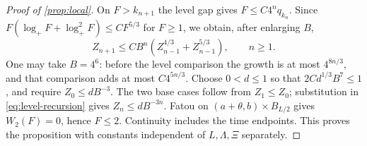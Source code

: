 \begin{proof}[Proof of \cref{prop:local}]
On $F>k_{n+1}$ the level gap gives $F\le C4^nq_{k_n}$. Since $F(\log_+F+\log_+^2F)\le CF^{5/3}$ for $F\ge1$, we obtain, after enlarging $B$,
\begin{equation}\label{eq:level-recursion}
 Z_{n+1}\le CB^n(Z_{n-1}^{4/3}+Z_{n-1}^{5/3}),\qquad n\ge1.
\end{equation}
One may take $B=4^6$: before the level comparison the growth is at most $4^{8n/3}$, and that comparison adds at most $C4^{5n/3}$. Choose $0<d\le1$ so that $2Cd^{1/3}B^7\le1$, and require $Z_0\le dB^{-3}$. The two base cases follow from $Z_1\le Z_0$; substitution in \eqref{eq:level-recursion} gives $Z_n\le dB^{-3n}$. Fatou on $(a+\theta,b)\times B_{L/2}$ gives $W_2(F)=0$, hence $F\le2$. Continuity includes the time endpoints. This proves the proposition with constants independent of $L,\Lambda,\Xi$ separately.
\end{proof}
